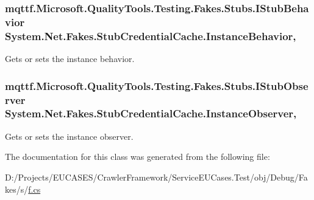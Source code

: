 \hypertarget{class_system_1_1_net_1_1_fakes_1_1_stub_credential_cache_a766d15153cdb4afda7784d2298a42b2e}{
\subsubsection[{Instance\-Behavior}]{\setlength{\rightskip}{0pt plus 5cm}mqttf.\-Microsoft.\-Quality\-Tools.\-Testing.\-Fakes.\-Stubs.\-I\-Stub\-Behavior System.\-Net.\-Fakes.\-Stub\-Credential\-Cache.\-Instance\-Behavior\hspace{0.3cm}{\ttfamily [get]}, {\ttfamily [set]}}}\label{class_system_1_1_net_1_1_fakes_1_1_stub_credential_cache_a766d15153cdb4afda7784d2298a42b2e}


Gets or sets the instance behavior.

\hypertarget{class_system_1_1_net_1_1_fakes_1_1_stub_credential_cache_a49b8f77ea6178725f76d28b64e92683f}{
\subsubsection[{Instance\-Observer}]{\setlength{\rightskip}{0pt plus 5cm}mqttf.\-Microsoft.\-Quality\-Tools.\-Testing.\-Fakes.\-Stubs.\-I\-Stub\-Observer System.\-Net.\-Fakes.\-Stub\-Credential\-Cache.\-Instance\-Observer\hspace{0.3cm}{\ttfamily [get]}, {\ttfamily [set]}}}\label{class_system_1_1_net_1_1_fakes_1_1_stub_credential_cache_a49b8f77ea6178725f76d28b64e92683f}


Gets or sets the instance observer.



The documentation for this class was generated from the following file\-:\begin{DoxyCompactItemize}
\item 
D\-:/\-Projects/\-E\-U\-C\-A\-S\-E\-S/\-Crawler\-Framework/\-Service\-E\-U\-Cases.\-Test/obj/\-Debug/\-Fakes/s/\hyperlink{s_2f_8cs}{f.\-cs}\end{DoxyCompactItemize}
